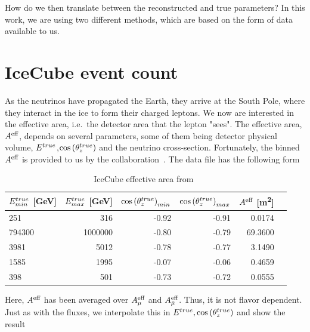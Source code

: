 \documentclass{thesis}
\begin{document}
How do we then translate between the reconstructed and true parameters? In this work, we are using two different methods, which are based on the form of data available to us. 

\section{IceCube event count}\label{ch:ICmethod}
As the neutrinos have propagated the Earth, they arrive at the South Pole, where they interact in the ice to form their charged leptons. We now are interested in the effective area, i.e.~the detector area that the lepton "sees".
The effective area, $A^\text{eff}$, depends on several parameters, some of them being detector physical volume, $E^{true}$,$\cos{(\theta_z^{true})}$ and the neutrino cross-section. Fortunately, the binned $A^\text{eff}$ is provided to us by the collaboration~\cite{ICaeff}.
The data file has the following form

\begin{table}\label{table:aeff}
    \begin{tabular}{lrrrrr}
        \hline \hline
        $E^{true}_{min}$ [\si{\GeV}] &     $E^{true}_{max}$ [\si{\GeV}]&   $\cos{(\theta_z^{true})}_{min}$ &   $\cos{(\theta_z^{true})}_{max}$ &     $A^\text{eff}$ [\si{\metre\squared}] \\
        \hline
             251 &      316 &  -0.92 &  -0.91 &   0.0174 \\
          794300 &  1000000 &  -0.80 &  -0.79 &  69.3600 \\
            3981 &     5012 &  -0.78 &  -0.77 &   3.1490 \\
            1585 &     1995 &  -0.07 &  -0.06 &   0.4659 \\
            398 &      501 &  -0.73 &  -0.72 &   0.0555 \\
        \hline
        \end{tabular}
    \caption{IceCube effective area from~\cite{ICaeff}}
\end{table}

Here, $A^\text{eff}$ has been averaged over $A^\text{eff}_\mu$ and $A^\text{eff}_{\bar{\mu}}$. Thus, it is not flavor dependent.
Just as with the fluxes, we interpolate this in $E^{true},\cos{(\theta_z^{true})}$ and show the result %
\end{document}

